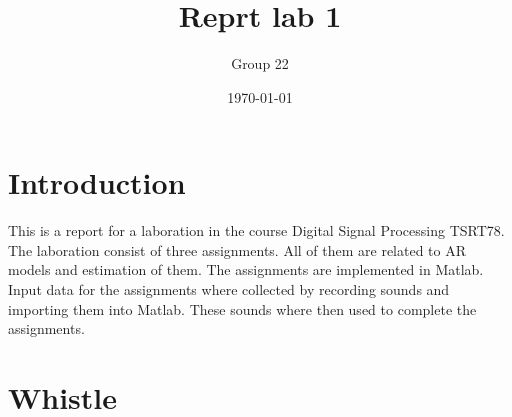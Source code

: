 \documentclass[12pt]{article}
\title{Reprt lab 1}
\author{Group 22}
\date{\today}
\begin{document}
%

\pagebreak

\maketitle

\pagebreak

\toc

\pagebreak

\section{Introduction}
This is a report for a laboration in the course Digital Signal Processing TSRT78.
The laboration consist of three assignments.
All of them are related to AR models and estimation of them.
The assignments are implemented in Matlab.
Input data for the assignments where collected by recording sounds and importing them into Matlab.
These sounds where then used to complete the assignments.

\section{Whistle}




\clearpage
{}
%
\end{document}
